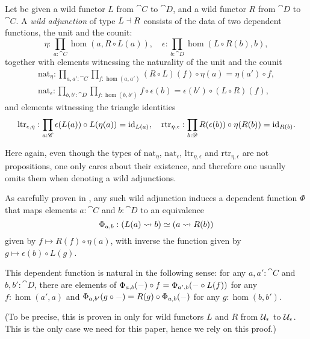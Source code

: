 \documentclass[english,a4]{article}
\def\githubpath{\tt\small}
\newcommand{\UUptd}{\UU_{\ast}}
\begin{document}
\begin{definition}
  Let be given a wild functor $L$ from $\cat C$ to $\cat D$, and a wild functor
  $R$ from $\cat D$ to $\cat C$. A \emph{wild adjunction} of type $L\dashv
  R$ consists of the data of two dependent functions, the unit and the counit:
  \begin{displaymath}
    \eta : \prod_{a:\cat C} \hom(a,R \circ L(a)), \quad
    \epsilon : \prod_{b:\cat D} \hom(L\circ R (b), b),
  \end{displaymath}
  together with elements witnessing the naturality of the unit and the counit
  \begin{gather*}
    \mathrm{nat}_\eta : \prod_{a,a':\cat C} \prod_{f:\hom(a,a')} (R\circ L)(f) \circ \eta(a) = \eta(a') \circ f, \\
    \mathrm{nat}_\epsilon : \prod_{b,b':\cat D} \prod_{f:\hom(b,b')} f \circ \epsilon(b) = \epsilon(b') \circ (L\circ R)(f),
  \end{gather*}
  and elements witnessing the triangle identities
  \begin{displaymath}
    \mathrm{ltr}_{\epsilon,\eta} : \prod_{a:\mathscr{C}} \epsilon(L(a)) \circ L(\eta(a)) = \mathord{\mathrm{id}}_{L(a)}, \quad
    \mathrm{rtr}_{\eta,\epsilon} : \prod_{b:\mathscr{D}} R(\epsilon(b)) \circ \eta(R(b)) = \mathord{\mathrm{id}}_{R(b)}.
  \end{displaymath}
\end{definition}
Here again, even though the types of $\mathrm{nat}_\eta$,
$\mathrm{nat}_\epsilon$, $\mathrm{ltr}_{\eta,\epsilon}$ and
$\mathrm{rtr}_{\eta,\epsilon}$ are not propositions, one only cares about their
existence, and therefore one usually omits them when denoting a wild
adjunctions.

\begin{remark} \label{def:wild-adj}
  As carefully proven in \cite[\githubpath
  theorems/homotopy/PtdAdjoint.agda]{hott-agda}, any such wild adjunction
  induces a dependent function $\Phi$ that maps elements $a:\cat C$ and $b:\cat
  D$ to an equivalence
  \begin{displaymath}
    \Phi_{a,b} : (\hom(L(a),b)) \weq (\hom(a,R(b)))
  \end{displaymath}
  given by $f \mapsto R(f) \circ \eta(a)$, with inverse the function given by
  $g\mapsto \epsilon(b) \circ L(g)$.

  This dependent function is natural in the following sense: for any $a,a':\cat
  C$ and $b,b':\cat D$, there are elements of $\Phi_{a,b}(\blank) \circ f =
  \Phi_{a',b} (\blank \circ L(f))$ for any $f:\hom(a',a)$ and
  $\Phi_{a,b'}(g\circ\blank) = R(g)\circ \Phi_{a,b} (\blank)$ for any
  $g:\hom(b,b')$. 
  
  (To be precise, this is proven in \cite{hott-agda} only for wild functors $L$
  and $R$ from $\UUptd$ to $\UUptd$. This is the only case we need for this
paper, hence we rely on this proof.)
\end{remark}
\end{document}
